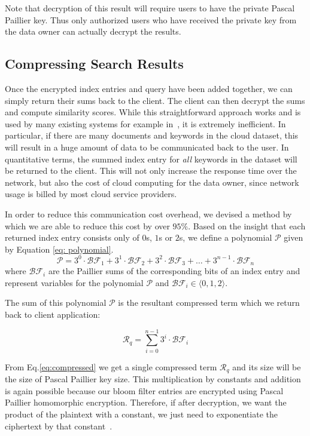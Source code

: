Note that decryption of this result will require users to have the private Pascal 
Paillier key. Thus only authorized users who have received the private key from the
data owner can actually decrypt the results.

\subsection{Compressing Search Results}

Once the encrypted index entries and query have been added together, 
we can simply return their sums back to the client. The client can then decrypt the
sums and compute similarity scores. While this straightforward approach works and
is used by many existing systems for example in~\cite{zeehan}, it is extremely
inefficient.
In particular, if there are many documents and keywords in the cloud dataset, this
will result in a huge amount of data to be communicated back to the user. In quantitative terms,
the summed index entry for \textit{all} keywords in the dataset will be returned
to the client. This will not only increase the response time over the network, but
also the cost of cloud computing for the data owner, since network usage is billed
by most cloud service providers.

In order to reduce this communication cost overhead, we devised a method by which
we are able to reduce this cost by over $95\%$. Based on the insight that each returned
index entry consists only of $0$s, $1$s or $2$s, we
define a polynomial $\mathcal{P}$ given by Equation \ref{eq: polynomial}. 
\begin{equation}
\mathcal{P} = 3^0\cdot\mathcal{BF}_1 + 3^1\cdot\mathcal{BF}_2 +
3^2\cdot\mathcal{BF}_3 + \ldots + 3^{n-1}\cdot\mathcal{BF}_n
  \label{eq: polynomial}
\end{equation}
where $\mathcal{BF}_i$  are the Paillier sums of the corresponding bits
of an index entry and represent variables for
the polynomial $\mathcal{P}$ and $\mathcal{BF}_i \in \langle 0,1,2 \rangle $.

The sum of this polynomial $\mathcal{P}$ is the resultant compressed term which we return back
to client application:

\begin{equation}
\mathcal{R}_q = \sum_{i=0}^{n-1} 3^{i}\cdot\mathcal{BF}_i
\label{eq:compressed}
\end{equation}

From Eq.\ref{eq:compressed} we get a single compressed term $\mathcal{R}_q$ and its size will be
the size of Pascal Paillier key size. This multiplication by constants and addition is again possible 
because our bloom filter entries are encrypted using Pascal Paillier homomorphic
encryption. Therefore, if after decryption, we want the product of the plaintext with a constant, we
just need to exponentiate the ciphertext by that constant~\cite{pascal}.

